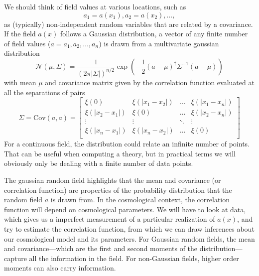 We should think of field values at various locations, such as 
\begin{equation}a_1 = a(x_1), a_2 = a(x_2), \dots, \end{equation}
as (typically) non-independent random variables that are related by a covariance.  If the field $a(x)$ follows a Gaussian distribution, a vector of any finite number of field values ($a = a_1,a_2,\dots,a_n$) is drawn from a multivariate gaussian distribution
\begin{equation}
  {\mathcal N}(\mu, \Sigma) = \frac{1}{(2\pi|\Sigma|)^{n/2}} \exp \left( -\frac{1}{2} (a - \mu)^\dag \Sigma^{-1} (a-\mu) \right)
\end{equation}
with mean $\mu$ and covariance matrix given by the correlation function evaluated at all the separations of pairs
\begin{equation}
  \Sigma = \textrm{Cov}(a,a) = \left[ \begin{array}{cccc}
    \xi(0) & \xi(|x_1-x_2|) & \dots & \xi(|x_1-x_n|) \\
    \xi(|x_2-x_1|) & \xi(0) & \dots & \xi(|x_2-x_n|) \\
    \vdots & \vdots & \ddots & \vdots \\
    \xi(|x_n-x_1|) & \xi(|x_n-x_2|) & \dots & \xi(0) \\    
    \end{array} \right] \label{eq:covariance_correlation_fun}
\end{equation}
For a continuous field, the distribution could relate an infinite number of points.  That can be useful when computing a theory, but in practical terms we will obviously only be dealing with a finite number of data points.

The gaussian random field highlights that the mean and covariance (or correlation function) are properties of the probability distribution that the random field $a$ is drawn from.  In the cosmological context, the correlation function will depend on cosmological parameters.  We will have to look at data, which gives us a imperfect measurement of a particular realization of $a(x)$, and try to estimate the correlation function, from which we can draw inferences about our cosmological model and its parameters.  For Gaussian random fields, the mean and covariance---which are the first and second moments of the distribution---capture all the information in the field.  For non-Gaussian fields, higher order moments can also carry information.

